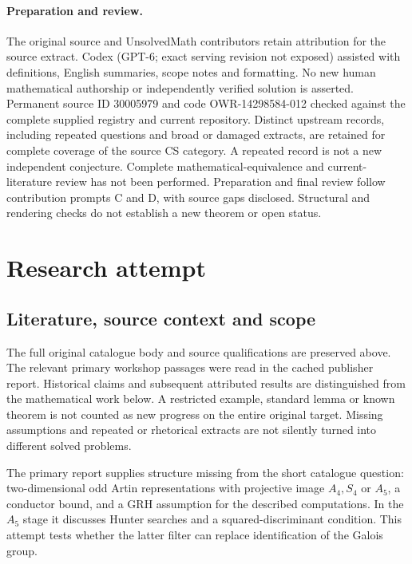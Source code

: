 \documentclass[11pt]{article}
\begin{document}
\paragraph{Preparation and review.}
The original source and UnsolvedMath contributors retain attribution for the source extract. Codex (GPT-6; exact serving revision not exposed) assisted with definitions, English summaries, scope notes and formatting. No new human mathematical authorship or independently verified solution is asserted. Permanent source ID 30005979 and code OWR-14298584-012 checked against the complete supplied registry and current repository. Distinct upstream records, including repeated questions and broad or damaged extracts, are retained for complete coverage of the source CS category. A repeated record is not a new independent conjecture. Complete mathematical-equivalence and current-literature review has not been performed. Preparation and final review follow contribution prompts C and D, with source gaps disclosed. Structural and rendering checks do not establish a new theorem or open status.
\label{end:30005979}

\section{Research attempt}
\subsection{Literature, source context and scope}
The full original catalogue body and source qualifications are preserved above. The relevant primary workshop passages were read in the cached publisher report. Historical claims and subsequent attributed results are distinguished from the mathematical work below. A restricted example, standard lemma or known theorem is not counted as new progress on the entire original target. Missing assumptions and repeated or rhetorical extracts are not silently turned into different solved problems.

The primary report supplies structure missing from the short catalogue question: two-dimensional odd Artin representations with projective image $A_4,S_4$ or $A_5$, a conductor bound, and a GRH assumption for the described computations. In the $A_5$ stage it discusses Hunter searches and a squared-discriminant condition. This attempt tests whether the latter filter can replace identification of the Galois group.
\end{document}
